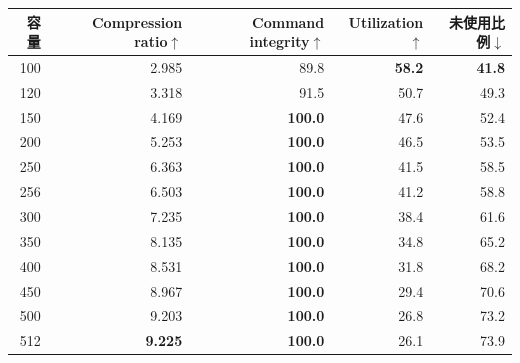 \begin{tabular*}{\linewidth}{@{\extracolsep{\fill}}rrrrr@{}}
\toprule
容量 & Compression ratio$\uparrow$ & Command integrity$\uparrow$ & Utilization$\uparrow$ & 未使用比例$\downarrow$\\
\midrule
100 & 2.985 & 89.8 & \textbf{58.2} & \textbf{41.8}\\
120 & 3.318 & 91.5 & 50.7 & 49.3\\
150 & 4.169 & \textbf{100.0} & 47.6 & 52.4\\
200 & 5.253 & \textbf{100.0} & 46.5 & 53.5\\
250 & 6.363 & \textbf{100.0} & 41.5 & 58.5\\
256 & 6.503 & \textbf{100.0} & 41.2 & 58.8\\
300 & 7.235 & \textbf{100.0} & 38.4 & 61.6\\
350 & 8.135 & \textbf{100.0} & 34.8 & 65.2\\
400 & 8.531 & \textbf{100.0} & 31.8 & 68.2\\
450 & 8.967 & \textbf{100.0} & 29.4 & 70.6\\
500 & 9.203 & \textbf{100.0} & 26.8 & 73.2\\
512 & \textbf{9.225} & \textbf{100.0} & 26.1 & 73.9\\
\bottomrule
\end{tabular*}
